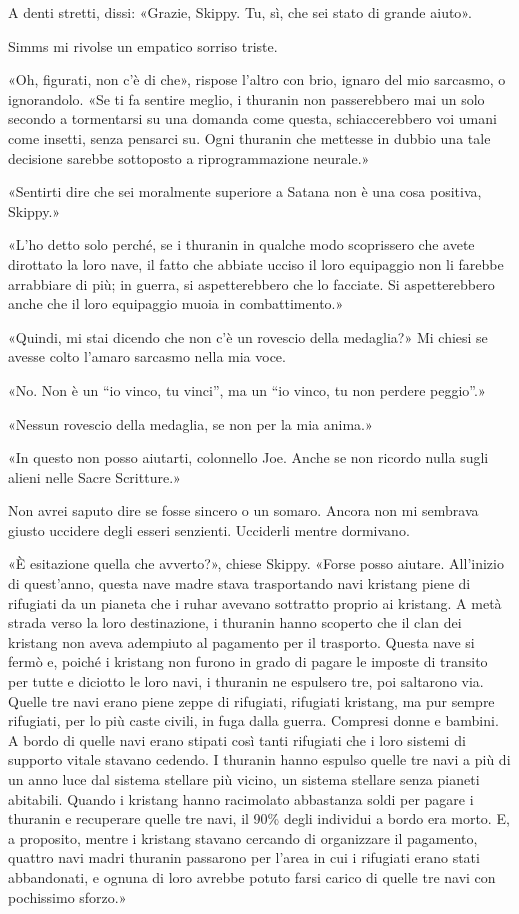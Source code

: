 A denti stretti, dissi: «Grazie, Skippy. Tu, sì, che sei stato di grande
aiuto».

Simms mi rivolse un empatico sorriso triste.

«Oh, figurati, non c'è di che», rispose l'altro con brio, ignaro del mio
sarcasmo, o ignorandolo. «Se ti fa sentire meglio, i thuranin non
passerebbero mai un solo secondo a tormentarsi su una domanda come
questa, schiaccerebbero voi umani come insetti, senza pensarci su. Ogni
thuranin che mettesse in dubbio una tale decisione sarebbe sottoposto a
riprogrammazione neurale.»

«Sentirti dire che sei moralmente superiore a Satana non è una cosa
positiva, Skippy.»

«L'ho detto solo perché, se i thuranin in qualche modo scoprissero che
avete dirottato la loro nave, il fatto che abbiate ucciso il loro
equipaggio non li farebbe arrabbiare di più; in guerra, si
aspetterebbero che lo facciate. Si aspetterebbero anche che il loro
equipaggio muoia in combattimento.»

«Quindi, mi stai dicendo che non c'è un rovescio della medaglia?» Mi
chiesi se avesse colto l'amaro sarcasmo nella mia voce.

«No. Non è un ``io vinco, tu vinci'', ma un ``io vinco, tu non perdere
peggio''.»

«Nessun rovescio della medaglia, se non per la mia anima.»

«In questo non posso aiutarti, colonnello Joe. Anche se non ricordo
nulla sugli alieni nelle Sacre Scritture.»

Non avrei saputo dire se fosse sincero o un somaro. Ancora non mi
sembrava giusto uccidere degli esseri senzienti. Ucciderli mentre
dormivano.

«È esitazione quella che avverto?», chiese Skippy. «Forse posso aiutare.
All'inizio di quest'anno, questa nave madre stava trasportando navi
kristang piene di rifugiati da un pianeta che i ruhar avevano sottratto
proprio ai kristang. A metà strada verso la loro destinazione, i
thuranin hanno scoperto che il clan dei kristang non aveva adempiuto al
pagamento per il trasporto. Questa nave si fermò e, poiché i kristang
non furono in grado di pagare le imposte di transito per tutte e
diciotto le loro navi, i thuranin ne espulsero tre, poi saltarono via.
Quelle tre navi erano piene zeppe di rifugiati, rifugiati kristang, ma
pur sempre rifugiati, per lo più caste civili, in fuga dalla guerra.
Compresi donne e bambini. A bordo di quelle navi erano stipati così
tanti rifugiati che i loro sistemi di supporto vitale stavano cedendo. I
thuranin hanno espulso quelle tre navi a più di un anno luce dal sistema
stellare più vicino, un sistema stellare senza pianeti abitabili. Quando
i kristang hanno racimolato abbastanza soldi per pagare i thuranin e
recuperare quelle tre navi, il 90\% degli individui a bordo era morto.
E, a proposito, mentre i kristang stavano cercando di organizzare il
pagamento, quattro navi madri thuranin passarono per l'area in cui i
rifugiati erano stati abbandonati, e ognuna di loro avrebbe potuto farsi
carico di quelle tre navi con pochissimo sforzo.»


